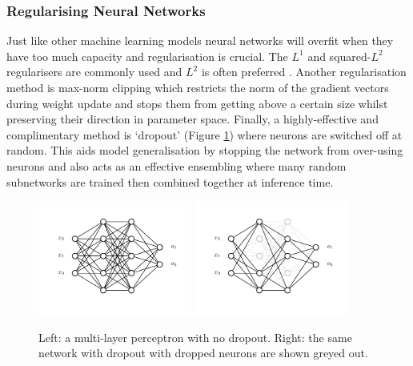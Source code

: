 \subsubsection{Regularising Neural Networks}
Just like other machine learning models neural networks will overfit when they have too much capacity and regularisation is crucial. The $L^{1}$ and squared-$L^{2}$ regularisers are commonly used and $L^{2}$ is often preferred \cite{CS231n}. Another regularisation method is max-norm clipping \cite{CS231n} which restricts the norm of the gradient vectors during weight update and stops them from getting above a certain size whilst preserving their direction in parameter space. Finally, a highly-effective and complimentary method is `dropout' \cite{Dropout} (Figure \ref{fig:machine_learning:dropout})  where neurons are switched off at random. This aids model generalisation by stopping the network from over-using neurons and also acts as an effective ensembling where many random subnetworks are trained then combined together at inference time.  
\begin{figure}[h!]
    \begin{center}
        \includegraphics[width=0.45\textwidth]{figures/machine_learning/no_dropout.pdf}
        \includegraphics[width=0.45\textwidth]{figures/machine_learning/dropout.pdf}
    \end{center}
    \caption{Left: a multi-layer perceptron with no dropout. Right: the same network with dropout with dropped neurons are shown greyed out.}
        \label{fig:machine_learning:dropout}
\end{figure}


